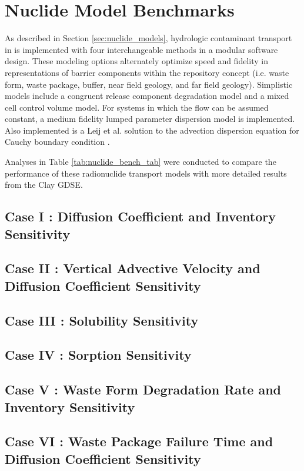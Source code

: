 \section{Nuclide Model Benchmarks}\label{sec:nuclide_benchmarks}

As described in Section \ref{sec:nuclide_models}, hydrologic contaminant 
transport in \Cyder is implemented with four interchangeable  methods in a 
modular software design. These modeling options alternately optimize speed and 
fidelity in representations of barrier components within the repository concept 
(i.e. waste form, waste package, buffer, near field geology, and far field 
geology)\cite{huff_hydrologic_2013}.  Simplistic models include a congruent 
release component degradation model and a mixed cell control volume model. For 
systems in which the flow can be assumed constant, a medium fidelity lumped 
parameter dispersion model is implemented. Also implemented is a Leij et al. 
solution to the advection dispersion equation for Cauchy boundary condition 
\cite{leij_analytical_1991, van_genuchten_analytical_1982}.  

Analyses in Table \ref{tab:nuclide_bench_tab} were conducted to compare the 
performance of these radionuclide transport models with more detailed results from the 
Clay \gls{GDSE}. 




\subsection{Case I : Diffusion Coefficient and Inventory Sensitivity}
\subsection{Case II : Vertical Advective Velocity and Diffusion Coefficient Sensitivity}
\subsection{Case III : Solubility Sensitivity}
\subsection{Case IV : Sorption Sensitivity}
\subsection{Case V : Waste Form Degradation Rate and Inventory Sensitivity}
\subsection{Case VI : Waste Package Failure Time and Diffusion Coefficient Sensitivity}
